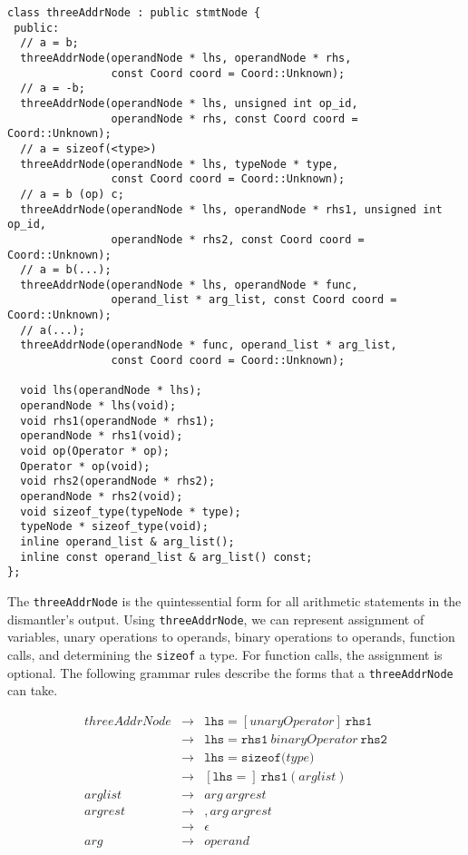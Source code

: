 \documentclass{article}
\begin{document}
\begin{verbatim}
class threeAddrNode : public stmtNode {
 public:
  // a = b;
  threeAddrNode(operandNode * lhs, operandNode * rhs, 
                const Coord coord = Coord::Unknown);
  // a = -b;
  threeAddrNode(operandNode * lhs, unsigned int op_id, 
                operandNode * rhs, const Coord coord = Coord::Unknown);
  // a = sizeof(<type>)
  threeAddrNode(operandNode * lhs, typeNode * type,
                const Coord coord = Coord::Unknown);
  // a = b (op) c;
  threeAddrNode(operandNode * lhs, operandNode * rhs1, unsigned int op_id,
                operandNode * rhs2, const Coord coord = Coord::Unknown);
  // a = b(...);
  threeAddrNode(operandNode * lhs, operandNode * func, 
                operand_list * arg_list, const Coord coord = Coord::Unknown);
  // a(...);
  threeAddrNode(operandNode * func, operand_list * arg_list, 
                const Coord coord = Coord::Unknown);

  void lhs(operandNode * lhs);
  operandNode * lhs(void);
  void rhs1(operandNode * rhs1);
  operandNode * rhs1(void);
  void op(Operator * op);
  Operator * op(void);
  void rhs2(operandNode * rhs2);
  operandNode * rhs2(void);
  void sizeof_type(typeNode * type);
  typeNode * sizeof_type(void);
  inline operand_list & arg_list();
  inline const operand_list & arg_list() const;
};
\end{verbatim}

The \texttt{threeAddrNode} is the quintessential form for all
arithmetic statements in the dismantler's output.  Using
\texttt{threeAddrNode}, we can represent assignment of variables,
unary operations to operands, binary operations to operands, function
calls, and determining the \texttt{sizeof} a type.  For function
calls, the assignment is optional.  The following grammar rules
describe the forms that a \texttt{threeAddrNode} can take.

\begin{eqnarray*}
threeAddrNode & \rightarrow & \texttt{lhs} = [unaryOperator]\ \texttt{rhs1} \\
              & \rightarrow & \texttt{lhs} = \texttt{rhs1}\ binaryOperator\ 
					     \texttt{rhs2} \\
              & \rightarrow & \texttt{lhs} = \texttt{sizeof(}type \texttt{)} \\
              & \rightarrow & [\texttt{lhs} =]\ \texttt{rhs1}(arglist) \\
arglist & \rightarrow & arg\ argrest \\
argrest & \rightarrow & , arg\ argrest \\
        & \rightarrow & \epsilon\\
arg     & \rightarrow & operand
\end{eqnarray*}
\end{document}

